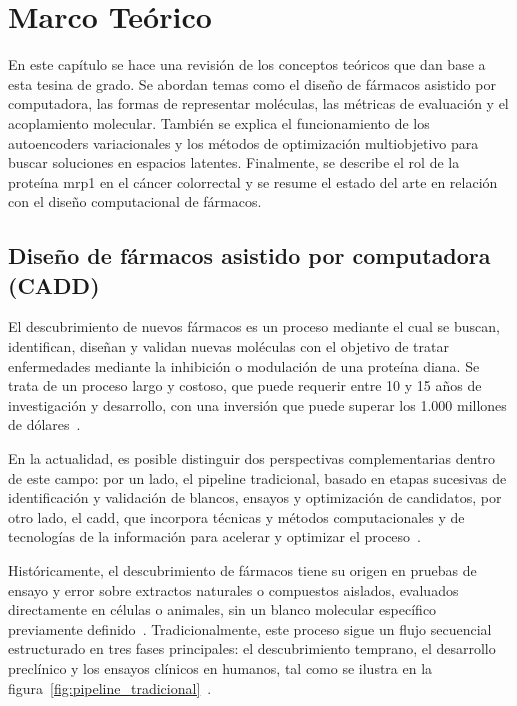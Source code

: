 \chapter{Marco Teórico}
\label{ch:marco_teorico}

En este capítulo se hace una revisión de los conceptos teóricos que dan base a esta tesina de grado. Se abordan temas como el diseño de fármacos asistido por computadora, las formas de representar moléculas, las métricas de evaluación y el acoplamiento molecular. También se explica el funcionamiento de los autoencoders variacionales y los métodos de optimización multiobjetivo para buscar soluciones en espacios latentes. Finalmente, se describe el rol de la proteína \gls{mrp1} en el cáncer colorrectal y se resume el estado del arte en relación con el diseño computacional de fármacos.

\section{Diseño de fármacos asistido por computadora (CADD)}
\label{sec:diseno_farmacos}

El descubrimiento de nuevos fármacos es un proceso mediante el cual se buscan, identifican, diseñan y validan nuevas moléculas con el objetivo de tratar enfermedades mediante la inhibición o modulación de una proteína diana. Se trata de un proceso largo y costoso, que puede requerir entre 10 y 15 años de investigación y desarrollo, con una inversión que puede superar los 1.000 millones de dólares~\cite{hughes2011principles}.

En la actualidad, es posible distinguir dos perspectivas complementarias dentro de este campo: por un lado, el pipeline tradicional, basado en etapas sucesivas de identificación y validación de blancos, ensayos y optimización de candidatos, por otro lado, el \gls{cadd}, que incorpora técnicas y métodos computacionales y de tecnologías de la información para acelerar y optimizar el proceso~\cite{zhang2025role}.

Históricamente, el descubrimiento de fármacos tiene su origen en pruebas de ensayo y error sobre extractos naturales o compuestos aislados, evaluados directamente en células o animales, sin un blanco molecular específico previamente definido~\cite{chawla2024computational}. Tradicionalmente, este proceso sigue un flujo secuencial estructurado en tres fases principales: el descubrimiento temprano, el desarrollo preclínico y los ensayos clínicos en humanos, tal como se ilustra en la figura~\ref{fig:pipeline_tradicional}~\cite{biala2023research, hughes2011principles}.

